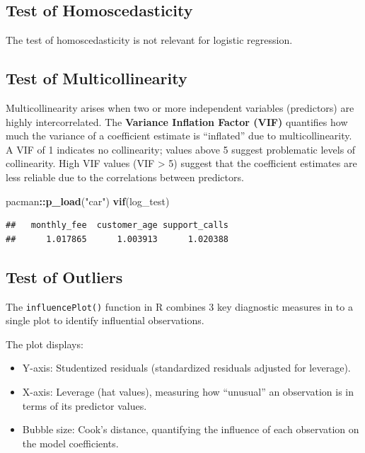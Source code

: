\documentclass[
]{article}
\newenvironment{Shaded}{\begin{snugshade}}{\end{snugshade}}
\newcommand{\FunctionTok}[1]{\textcolor[rgb]{0.13,0.29,0.53}{\textbf{#1}}}
\newcommand{\NormalTok}[1]{#1}
\newcommand{\SpecialCharTok}[1]{\textcolor[rgb]{0.81,0.36,0.00}{\textbf{#1}}}
\newcommand{\StringTok}[1]{\textcolor[rgb]{0.31,0.60,0.02}{#1}}
\begin{document}
\subsection{Test of Homoscedasticity}\label{test-of-homoscedasticity}

The test of homoscedasticity is not relevant for logistic regression.

\subsection{Test of Multicollinearity}\label{test-of-multicollinearity}

Multicollinearity arises when two or more independent variables
(predictors) are highly intercorrelated. The \textbf{Variance Inflation
Factor (VIF)} quantifies how much the variance of a coefficient estimate
is ``inflated'' due to multicollinearity. A VIF of 1 indicates no
collinearity; values above 5 suggest problematic levels of collinearity.
High VIF values (VIF \textgreater{} 5) suggest that the coefficient
estimates are less reliable due to the correlations between predictors.

\begin{Shaded}
\begin{Highlighting}[]
\NormalTok{pacman}\SpecialCharTok{::}\FunctionTok{p\_load}\NormalTok{(}\StringTok{"car"}\NormalTok{)}
\FunctionTok{vif}\NormalTok{(log\_test)}
\end{Highlighting}
\end{Shaded}

\begin{verbatim}
##   monthly_fee  customer_age support_calls 
##      1.017865      1.003913      1.020388
\end{verbatim}

\subsection{Test of Outliers}\label{test-of-outliers}

The \texttt{influencePlot()} function in R combines 3 key diagnostic
measures in to a single plot to identify influential observations.

The plot displays:

\begin{itemize}
\item
  Y-axis: Studentized residuals (standardized residuals adjusted for
  leverage).
\item
  X-axis: Leverage (hat values), measuring how ``unusual'' an
  observation is in terms of its predictor values.
\item
  Bubble size: Cook's distance, quantifying the influence of each
  observation on the model coefficients.
\end{itemize}
\end{document}
